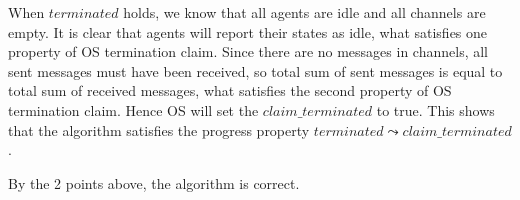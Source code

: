 \documentclass[10pt,letter]{article}
\begin{document}
When $terminated$ holds, we know that all agents are idle and all channels are empty. It is clear that agents will report their states as idle, what satisfies one property of OS termination claim. Since there are no messages in channels, all sent messages must have been received, so total sum of sent messages is equal to total sum of received messages, what satisfies the second property of OS termination claim. Hence OS will set the $claim\_terminated$ to true. This shows that the algorithm satisfies the progress property $terminated \leadsto claim\_terminated$.

By the 2 points above, the algorithm is correct.
\end{document}
